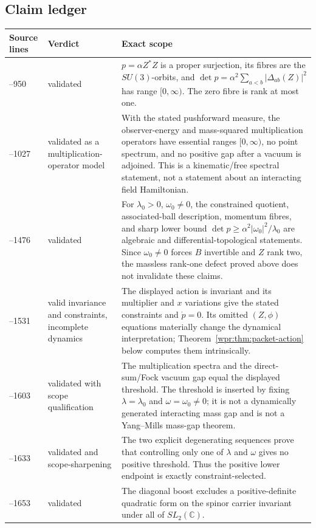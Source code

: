 \documentclass[11pt]{article}
\begin{document}
\subsection{Claim ledger}

\begin{center}
\begin{tabular}{>{\raggedright\arraybackslash}p{}
                >{\raggedright\arraybackslash}p{}
                >{\raggedright\arraybackslash}p{}}
\toprule
Source lines&Verdict&Exact scope\\
\midrule
875--950&validated&
\(p=\alpha Z^*Z\) is a proper surjection, its fibres are the
\(SU(3)\)-orbits, and
\(\det p=\alpha^2\sum_{a<b}|\Delta_{ab}(Z)|^2\) has range
\([0,\infty)\).  The zero fibre is rank at most one.\\
\addlinespace
952--1027&validated as a multiplication-operator model&
With the stated pushforward measure, the observer-energy and
mass-squared multiplication operators have essential ranges
\([0,\infty)\), no point spectrum, and no positive gap after a vacuum
is adjoined.  This is a kinematic/free spectral statement, not a
statement about an interacting field Hamiltonian.\\
\addlinespace
1029--1476&validated&
For \(\lambda_0>0\), \(\omega_0\neq0\), the constrained quotient,
associated-ball description, momentum fibres, and sharp lower bound
\(\det p\geq\alpha^2|\omega_0|^2/\lambda_0\) are algebraic and
differential-topological statements.  Since \(\omega_0\neq0\) forces
\(B\) invertible and \(Z\) rank two, the massless rank-one defect
proved above does not invalidate these claims.\\
\addlinespace
1482--1531&valid invariance and constraints, incomplete dynamics&
The displayed action is invariant and its multiplier and \(x\)
variations give the stated constraints and \(\dot p=0\).  Its omitted
\((Z,\phi)\) equations materially change the dynamical interpretation;
Theorem~\ref{wpr:thm:packet-action} below computes them intrinsically.\\
\addlinespace
1533--1603&validated with scope qualification&
The multiplication spectra and the direct-sum/Fock vacuum gap equal
the displayed threshold.  The threshold is inserted by fixing
\(\lambda=\lambda_0\) and \(\omega=\omega_0\neq0\); it is not a
dynamically generated interacting mass gap and is not a Yang--Mills
mass-gap theorem.\\
\addlinespace
1605--1633&validated and scope-sharpening&
The two explicit degenerating sequences prove that controlling only
one of \(\lambda\) and \(\omega\) gives no positive threshold.  Thus
the positive lower endpoint is exactly constraint-selected.\\
\addlinespace
1635--1653&validated&
The diagonal boost excludes a positive-definite quadratic form on the
spinor carrier invariant under all of \(SL_2(\mathbb C)\).\\
\bottomrule
\end{tabular}
\end{center}
\end{document}
